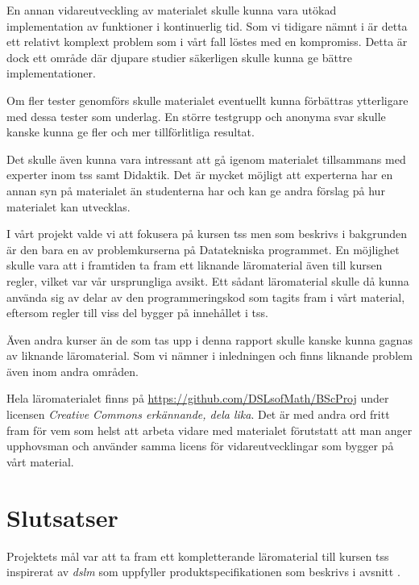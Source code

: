 \documentclass[12pt,a4paper,twoside,openright]{article}
\begin{document}
En annan vidareutveckling av materialet skulle kunna vara utökad
implementation av funktioner i kontinuerlig tid. Som vi tidigare nämnt
i  är detta ett relativt komplext problem som i
vårt fall löstes med en kompromiss. Detta är dock ett område där
djupare studier säkerligen skulle kunna ge bättre implementationer.

Om fler tester genomförs skulle materialet eventuellt kunna förbättras
ytterligare med dessa tester som underlag. En större testgrupp och
anonyma svar skulle kanske kunna ge fler och mer tillförlitliga
resultat.

Det skulle även kunna vara intressant att gå igenom materialet
tillsammans med experter inom \gls{tss} samt Didaktik. Det är
mycket möjligt att experterna har en annan syn på materialet än
studenterna har och kan ge andra förslag på hur materialet kan
utvecklas.

I vårt projekt valde vi att fokusera på kursen \gls{tss} men som
beskrivs i bakgrunden är den bara en av problemkurserna på
Datatekniska programmet. En möjlighet skulle vara att i framtiden ta
fram ett liknande läromaterial även till kursen
\gls{regler}, vilket var vår ursprungliga avsikt. Ett sådant läromaterial skulle då kunna använda
sig av delar av den programmeringskod som tagits fram i vårt material,
eftersom \gls{regler} till viss del bygger på innehållet i
\gls{tss}.

Även andra kurser än de som tas upp i denna rapport skulle kanske
kunna gagnas av liknande läromaterial. Som vi nämner i inledningen och
 finns liknande problem även inom andra
områden.

Hela läromaterialet finns på
\url{https://github.com/DSLsofMath/BScProj} under\\licensen
\textit{Creative Commons erkännande, dela lika}.
Det är med andra ord fritt fram för
vem som helst att arbeta vidare med materialet förutstatt att man anger 
upphovsman och använder samma licens för vidareutvecklingar som bygger på
vårt material.

\newpage

\section{Slutsatser}

Projektets mål var att ta fram ett kompletterande läromaterial till
kursen \gls{tss} inspirerat av \textit{\gls{dslm}} som uppfyller
produktspecifikationen som beskrivs i avsnitt .
\end{document}
